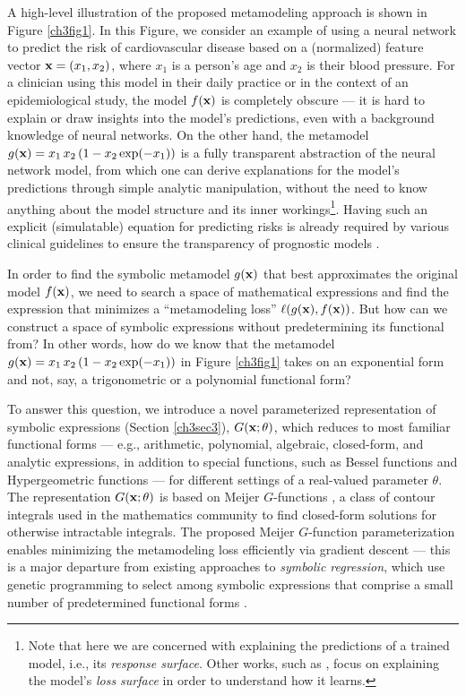 \documentclass [PhD] {uclathes}
\begin{document}
A high-level illustration of the proposed metamodeling approach is shown in Figure \ref{ch3fig1}. In this Figure, we consider an example of using a neural network to predict the risk of cardiovascular disease based on a (normalized) feature vector ${\bf x} = (x_1, x_2)$, where $x_1$ is a person's age and $x_2$ is their blood pressure. For a clinician using this model in their daily practice or in the context of an epidemiological study, the model $f({\bf x})$ is completely obscure --- it is hard to explain or draw insights into the model's predictions, even with a background knowledge of neural networks. On the other hand, the metamodel $g({\bf x}) = x_1\,x_2\,(1-x_2\exp(-x_1))$ is a fully transparent abstraction of the neural network model, from which one can derive explanations for the model's predictions through simple analytic manipulation, without the need to know anything about the model structure and its inner workings\footnote{Note that here we are concerned with explaining the predictions of a trained model, i.e., its \textit{response surface}. Other works, such as \cite{koh2017understanding}, focus on explaining the model's \textit{loss surface} in order to understand how it learns.}. Having such an explicit (simulatable) equation for predicting risks is already required by various clinical guidelines to ensure the transparency of prognostic models \cite{kattan2016american}. 

In order to find the symbolic metamodel $g({\bf x})$ that best approximates the original model $f({\bf x})$, we need to search a space of mathematical expressions and find the expression that minimizes a ``metamodeling loss'' $\ell(g({\bf x}), f({\bf x}))$. But how can we construct a space of symbolic expressions without predetermining its functional from? In other words, how do we know that the metamodel $g({\bf x}) = x_1\,x_2\,(1-x_2\exp(-x_1))$ in Figure \ref{ch3fig1} takes on an exponential form and not, say, a trigonometric or a polynomial functional form?   

To answer this question, we introduce a novel parameterized representation of symbolic expressions (Section \ref{ch3sec3}), $G({\bf x};\theta)$, which reduces to most familiar functional forms --- e.g., arithmetic, polynomial, algebraic, closed-form, and	analytic expressions, in addition to special functions, such as Bessel functions and Hypergeometric functions --- for different settings of a real-valued parameter $\theta$. The representation $G({\bf x};\theta)$ is based on Meijer $G$-functions \cite{meijer1946gfunc,meijer1936uber,beals2013meijer}, a class of contour integrals used in the mathematics community to find closed-form solutions for otherwise intractable integrals. The proposed Meijer $G$-function parameterization enables minimizing the metamodeling loss efficiently via gradient descent --- this is a major departure from existing approaches to {\it symbolic regression}, which use genetic programming to select among symbolic expressions that comprise a small number of predetermined functional forms \cite{orzechowski2018we,menezes2014symbolic,vladislavleva2009order}. 
\end{document}
